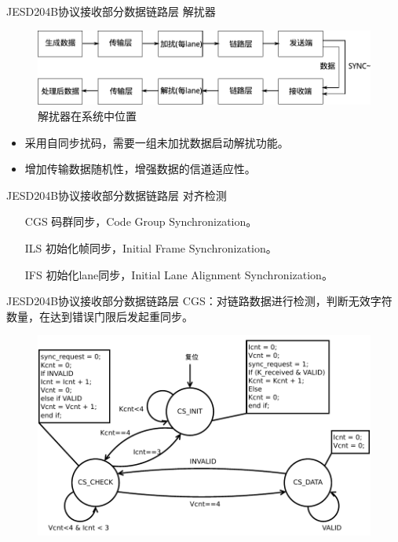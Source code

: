 \documentclass{beamer}
\begin{document}
\begin{frame}{JESD204B协议接收部分}{数据链路层}
  解扰器
  \begin{figure}
	\centering
	\includegraphics[scale=0.65]{./img/functional_location_of_scrambler_and_descrambler.pdf}
	\caption{解扰器在系统中位置}
	\end{figure}
  \begin{itemize}
  \item 采用自同步扰码，需要一组未加扰数据启动解扰功能。
  \item 增加传输数据随机性，增强数据的信道适应性。
  \end{itemize}
\end{frame}

\begin{frame}{JESD204B协议接收部分}{数据链路层}
  对齐检测
  \begin{itemize}
  \item [CGS] 码群同步，Code Group Synchronization。
  \item [ILS] 初始化帧同步，Initial Frame Synchronization。
  \item [IFS] 初始化lane同步，Initial Lane Alignment Synchronization。
  \end{itemize}
\end{frame}

\begin{frame}{JESD204B协议接收部分}{数据链路层}
  CGS：对链路数据进行检测，判断无效字符数量，在达到错误门限后发起重同步。
  \begin{figure}
	\centering
	\includegraphics[scale=0.5]{./img/cgs_fsm.pdf}
	\end{figure}
\end{frame}
\end{document}
